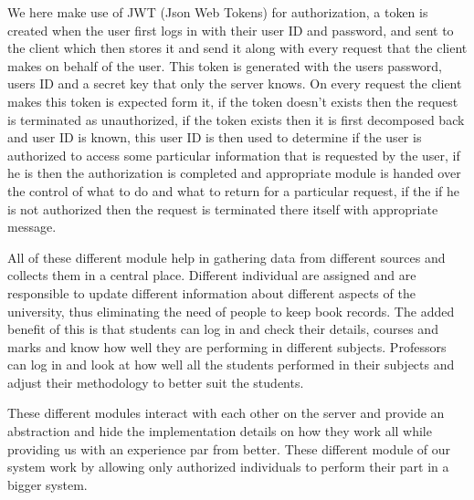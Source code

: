 We here make use of JWT (Json Web Tokens) for authorization, a token is created
when the user first logs in with their user ID and password, and sent to the
client which then stores it and send it along with every request that the client
makes on behalf of the user. This token is generated with the users password,
users ID and a secret key that only the server knows. On every request the
client makes this token is expected form it, if the token doesn't exists then
the request is terminated as unauthorized, if the token exists then it is first
decomposed back and user ID is known, this user ID is then used to determine if
the user is authorized to access some particular information that is requested
by the user, if he is then the authorization is completed and appropriate module
is handed over the control of what to do and what to return for a particular
request, if the if he is not authorized then the request is terminated there
itself with appropriate message.

\newpage
All of these different module help in gathering data from different sources and
collects them in a central place. Different individual are assigned and are
responsible to update different information about different aspects of the
university, thus eliminating the need of people to keep book records. The added
benefit of this is that students can log in and check their details, courses
and marks and know how well they are performing in different subjects.
Professors can log in and look at how well all the students performed in their
subjects and adjust their methodology to better suit the students.

These different modules interact with each other on the server and provide an
abstraction and hide the implementation details on how they work all while
providing us with an experience par from better. These different module of our
system work by allowing only authorized individuals to perform their part in a
bigger system.
